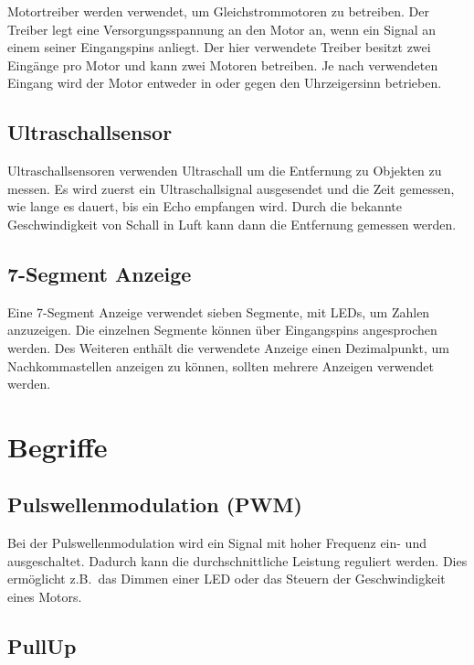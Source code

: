 Motortreiber werden verwendet, um Gleichstrommotoren zu betreiben.
Der Treiber legt eine Versorgungsspannung an den Motor an, wenn ein Signal an einem seiner Eingangspins anliegt.
Der hier verwendete Treiber besitzt zwei Eingänge pro Motor und kann zwei Motoren betreiben.
Je nach verwendeten Eingang wird der Motor entweder in oder gegen den Uhrzeigersinn betrieben.

\subsection{Ultraschallsensor}
\label{subsec:ultraschallsensor}

Ultraschallsensoren verwenden Ultraschall um die Entfernung zu Objekten zu messen.
Es wird zuerst ein Ultraschallsignal ausgesendet und die Zeit gemessen, wie lange es dauert, bis ein Echo empfangen wird.
Durch die bekannte Geschwindigkeit von Schall in Luft kann dann die Entfernung gemessen werden.

\subsection{7-Segment Anzeige}
\label{subsec:7-segment-anzeige}

Eine 7-Segment Anzeige verwendet sieben Segmente, mit LEDs, um Zahlen anzuzeigen.
Die einzelnen Segmente können über Eingangspins angesprochen werden.
Des Weiteren enthält die verwendete Anzeige einen Dezimalpunkt, um Nachkommastellen anzeigen zu können, sollten mehrere Anzeigen verwendet werden.

\section{Begriffe}
\label{sec:begriffe}

\subsection{Pulswellenmodulation (PWM)}
\label{subsec:pulsewellenmodulation}

Bei der Pulswellenmodulation wird ein Signal mit hoher Frequenz ein- und ausgeschaltet.
Dadurch kann die durchschnittliche Leistung reguliert werden.
Dies ermöglicht z.B.\ das Dimmen einer LED oder das Steuern der Geschwindigkeit eines Motors.

\subsection{PullUp}
\label{subsec:pullup}

